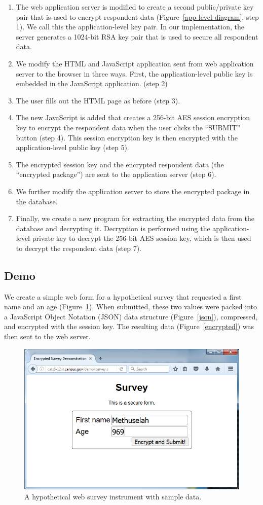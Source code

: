 \documentclass[fleqn,10pt]{wlscirep}
\begin{document}
\begin{enumerate}
\item The web application server is modified to create a second
  public/private key pair that is used to encrypt respondent
  data (Figure~\ref{app-level-diagram}, step 1).  We
  call this the application-level key pair. In our implementation, the
  server generates a 1024-bit RSA key pair that is used to secure all
  respondent data.
\item We modify the HTML and JavaScript application sent from web
  application server to the browser in three ways. First, the
  application-level public key is embedded in the JavaScript
  application. (step 2)
\item The user fills out the HTML page as before (step 3).
\item The new JavaScript is added that creates a 256-bit
  AES session encryption key to encrypt the respondent data when the user clicks the
  ``SUBMIT'' button (step 4). This session encryption key is then encrypted
  with the application-level public key (step 5).
\item The encrypted session key and the encrypted respondent data (the ``encrypted
  package'') are sent to the
  application server (step 6). 
\item We further modify the application server to store the encrypted
  package in the database.
\item Finally, we create a new program for extracting the encrypted
  data from the database and decrypting it. Decryption is performed
  using the application-level private key to decrypt the 256-bit AES
  session key, which is then used to decrypt the respondent data (step
  7).
\end{enumerate}


\subsection{Demo}

We create a simple web form for a hypothetical survey that requested a
first name and an age (Figure~\ref{survey}). When submitted, these two
values were packed into a JavaScript Object Notation (JSON) data
structure (Figure~\ref{json}), compressed, and encrypted with the session key. The
resulting data (Figure~\ref{encrypted}) was then sent to the web server.

\begin{figure}
  \centering
  \includegraphics[width=.5\linewidth]{art/figure1}
  \caption{A hypothetical web survey instrument with sample
    data.}\label{survey}
  \end{figure}
\end{document}
